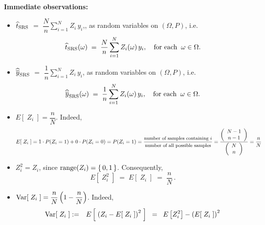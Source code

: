 \documentclass{article}
\begin{document}
\noindent\textbf{Immediate observations:}
\begin{itemize}
\item  $\widehat{t}_{\textnormal{SRS}}$ $=$ $\dfrac{N}{n}\sum^{N}_{i=1} Z_{i}\,y_{i}$,, as random variables on $(\Omega,P)$, i.e.
          \begin{equation*}
              \widehat{t}_{\textnormal{SRS}}(\omega) \; = \; \dfrac{N}{n}\sum_{i=1}^{N} Z_{i}(\omega)\,y_{i},
               \quad\textnormal{for each} \;\; \omega \in \Omega.
          \end{equation*}
\item  $\widehat{\overline{y}}_{\textnormal{SRS}}$ $=$ $\dfrac{1}{n}\sum_{i=1}^{N} Z_{i}\,y_{i}$, as random variables on $(\Omega,P)$, i.e.
          \begin{equation*}
              \widehat{\overline{y}}_{\textnormal{SRS}}(\omega) \; = \; \dfrac{1}{n}\sum_{i=1}^{N} Z_{i}(\omega)\,y_{i},
               \quad\textnormal{for each} \;\; \omega \in \Omega.
          \end{equation*}
\item  $E[\;Z_{i}\;] = \dfrac{n}{N}$.  \; Indeed,
          \begin{equation*}
              E[\;Z_{i}\;] = 1 \cdot P(Z_{i}=1) + 0 \cdot P(Z_{i}=0) = P(Z_{i}=1)
              = \dfrac{\textnormal{\small number of samples containing $i$}}{\textnormal{\small number of all possible samples}}
              = \dfrac{\left(\begin{array}{c} N-1 \\ n-1 \end{array}\right)}{\left(\begin{array}{c} N \\ n \end{array}\right)}
              = \dfrac{n}{N}
          \end{equation*}
\item  $Z_{i}^{2} = Z_{i}$, since $\textnormal{range}(Z_{i}) = \{\,0,1\,\}$.  Consequently,
          \begin{equation*}
              E[\;Z_{i}^{2}\;] \; = \; E[\;Z_{i}\;] \; = \; \dfrac{n}{N}\,.
          \end{equation*}
\item  $\textnormal{Var}[\;Z_{i}\;] = \dfrac{n}{N}\left(1 - \dfrac{n}{N}\right)$. \; Indeed,
          \begin{eqnarray*}
              \textnormal{Var}[\;Z_{i}\;] & := & E\left[\;\left(Z_{i} - E[\;Z_{i}\;]\right)^{2}\;\right]
                                                      \;\; = \;\; E\left[Z_{i}^{2}\right] - \left(E[\;Z_{i}\;]\right)^{2} \\

\end{eqnarray*}
\end{itemize}
\end{document}
